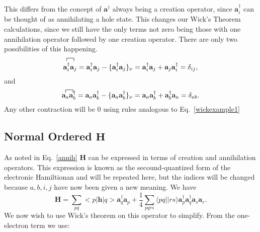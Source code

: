 \documentclass[a4paper,norsk,11pt,twoside]{report}
\begin{document}
This differs from the concept of $\textbf{a}^{\dag}$ always being a
creation operator, since $\textbf{a}^{\dag}_i$ can be thought of as
annihilating a hole state. This changes our Wick's Theorem
calculations, since we still have the only terms not zero being those
with one annihilation operator followed by one creation
operator. There are only two possibilities of this happening.
\begin{equation}
\contraction{}{\textbf{a}^{\dag}_i}{}{\textbf{a}_j}
\textbf{a}^{\dag}_i \textbf{a}_j
 = \textbf{a}^{\dag}_i \textbf{a}_j
 - \{\textbf{a}^{\dag}_i \textbf{a}_j \}_{\nu} = \textbf{a}^{\dag}_i \textbf{a}_j
 +  \textbf{a}_j \textbf{a}^{\dag}_i = \delta_{ij} , \label{fermi1}
\end{equation}
and
\begin{equation}
\contraction{}{\textbf{a}_a}{}{\textbf{a}^{\dag}_b}
\textbf{a}_a \textbf{a}^{\dag}_b = \textbf{a}_a \textbf{a}^{\dag}_b - \{\textbf{a}_a \textbf{a}^{\dag}_b\}_{\nu} = \textbf{a}_a \textbf{a}^{\dag}_b + \textbf{a}^{\dag}_b \textbf{a}_a = \delta_{ab} . \label{fermi2}
\end{equation}
Any other contraction will be 0 using rules analogous to Eq.~\eqref{wickexample1}

\subsection{Normal Ordered $\textbf{H}$}
As noted in Eq.~\eqref{annih} $\textbf{H}$ can be expressed in terms
of creation and annihilation operators. This expression is known as
the secound-quantized form of the electronic Hamiltionan and will be
repeated here, but the indices will be changed because $a,b,i,j$ have
now been given a new meaning. We have
\begin{equation}
\textbf{H} = \sum_{pq} <p|\textbf{h}|q> \textbf{a}^{\dag}_q \textbf{a}_p + 
\frac{1}{4} \sum_{pqrs} \langle pq||rs \rangle \textbf{a}^{\dag}_p \textbf{a}^{\dag}_q \textbf{a}_s \textbf{a}_r .
\end{equation}
We now wish to use Wick's theorem on this operator to simplify. From the one-electron term we use:
\end{document}
